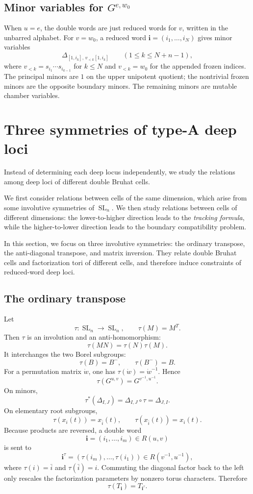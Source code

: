 \documentclass[12pt]{amsart}
\newcommand{\SL}{\operatorname{SL}}
\newcommand{\bi}{\mathbf i}
\theoremstyle{plain}
\theoremstyle{definition}
\theoremstyle{remark}
\begin{document}
\subsection{Minor variables for \texorpdfstring{$G^{e,w_0}$}{G(e,w0)}}

When $u=e$, the double words are just reduced words for $v$, written in the unbarred alphabet.  For $v=w_0$, a reduced word $\bi=(i_1,\ldots,i_N)$ gives minor variables
\[
   \Delta_{[1,i_k],\,v_{<k}[1,i_k]}
   \qquad (1\leq k\leq N+n-1),
\]
where $v_{<k}=s_{i_1}\cdots s_{i_{k-1}}$ for $k\leq N$ and $v_{<k}=w_0$ for the appended frozen indices.  The principal minors are $1$ on the upper unipotent quotient; the nontrivial frozen minors are the opposite boundary minors.  The remaining minors are mutable chamber variables.

\section{Three symmetries of type-A deep loci}\label{sec:symmetries}

Instead of determining each deep locus independently, we study the relations among deep loci of different double Bruhat cells.

We first consider relations between cells of the same dimension, which arise from some involutive symmetries of $\SL_n$. We then study relations between cells of different dimensions: the lower-to-higher direction leads to the \emph{tracking formula}, while the higher-to-lower direction leads to the boundary compatibility problem.

In this section, we focus on three involutive symmetries: the ordinary transpose, the anti-diagonal transpose, and matrix inversion. They relate double Bruhat cells and factorization tori of different cells,  and therefore induce constraints of reduced-word deep loci.

\subsection{The ordinary transpose}

Let
\[
   \tau:\SL_n\longrightarrow \SL_n,
   \qquad
   \tau(M)=M^T.
\]
Then $\tau$ is an involution and an anti-homomorphism:
\[
   \tau(MN)=\tau(N)\tau(M).
\]
It interchanges the two Borel subgroups:
\[
   \tau(B)=B^- ,
   \qquad
   \tau(B^-)=B.
\]
For a permutation matrix $\dot w$, one has $\tau(\dot w)=\dot w^{-1}$.  Hence
\[
   \tau(G^{u,v})=G^{v^{-1},u^{-1}}.
\]
On minors,
\[
   \tau^*(\Delta_{I,J})=\Delta_{I,J}\circ\tau=\Delta_{J,I}.
\]
On elementary root subgroups,
\[
   \tau(x_i(t))=x_{\bar i}(t),
   \qquad
   \tau(x_{\bar i}(t))=x_i(t).
\]
Because products are reversed, a double word
\[
   \bi=(i_1,\ldots,i_m)\in R(u,v)
\]
is sent to
\[
   \bi^\tau=(\tau(i_m),\ldots,\tau(i_1))
   \in R(v^{-1},u^{-1}),
\]
where $\tau(i)=\bar i$ and $\tau(\bar i)=i$.  Commuting the diagonal factor back to the left only rescales the factorization parameters by nonzero torus characters.  Therefore
\[
   \tau(T_{\bi})=T_{\bi^\tau}.
\]
\end{document}
